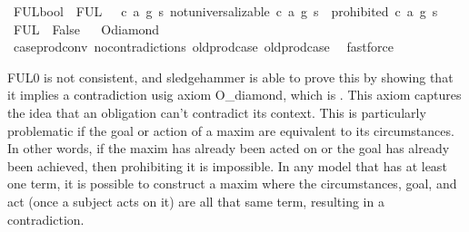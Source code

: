 \begin{isabellebody}
\begin{isamarkuptext}
\end{isamarkuptext}\isamarkuptrue%
\isamarkupfalse%
\ FUL{}{\isacharcolon}{\isacharcolon}bool\ \ {\isachardoublequoteopen}FUL{}\ {\isasymequiv}\ {\isasymforall}\ c\ a\ g\ s{\isachardot}\ not{\isacharunderscore}universalizable\ {\isacharparenleft}c{\isacharcomma}\ a{\isacharcomma}\ g{\isacharparenright}\ s\ {\isasymlongrightarrow}\ {\isasymTurnstile}{\isacharparenleft}{\isacharparenleft}prohibited\ {\isacharparenleft}c{\isacharcomma}\ a{\isacharcomma}\ g{\isacharparenright}\ s{\isacharparenright}{\isacharparenright}{\isachardoublequoteclose}\isanewline
%
\isanewline
\isanewline
{}\isamarkupfalse%
\ {\isachardoublequoteopen}FUL{}\ {\isasymlongrightarrow}\ False{\isachardoublequoteclose}%
\isadelimproof
\ %
\endisadelimproof
%
\isatagproof
{}\isamarkupfalse%
\ O{\isacharunderscore}diamond\isanewline
\ \ \isamarkupfalse%
\ case{\isacharunderscore}prod{\isacharunderscore}conv\ no{\isacharunderscore}contradictions\ old{\isachardot}prod{\isachardot}case\ old{\isachardot}prod{\isachardot}case\ \isamarkupfalse%
\ fastforce%
\endisatagproof
{\isafoldproof}%
%
\isadelimproof
%
\endisadelimproof
%
\begin{isamarkuptext}%
FUL0 is not consistent, and sledgehammer is able to prove this by showing that it implies a contradiction 
usig axiom O\_diamond, which is . This axiom captures 
the idea that an obligation can't contradict its context. This is particularly problematic if the goal or 
action of a maxim are equivalent to its circumstances. In other words, if the maxim has already been 
acted on or the goal has already been achieved, then prohibiting it is impossible. 
In any model that has at least one term, it is possible to construct a maxim where the circumstances, goal, 
and act (once a subject acts on it) are all that same term, resulting in a contradiction. 


\end{isamarkuptext}
\end{isabellebody}
